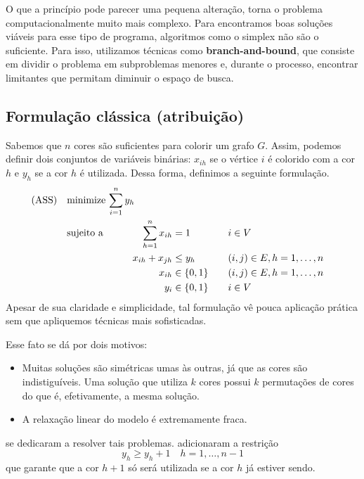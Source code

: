 \documentclass[11pt]{article}
\begin{document}
O que a princípio pode parecer uma pequena alteração, torna o problema computacionalmente muito mais complexo.
Para encontramos boas soluções viáveis para esse tipo de programa, algoritmos como o simplex não são o suficiente.
Para isso, utilizamos técnicas como \textbf{branch-and-bound}, que consiste em dividir o problema em subproblemas menores e, durante o processo, encontrar limitantes que permitam diminuir o espaço de busca.

\subsection{Formulação clássica (atribuição)}
\label{sec:org83e1630}
Sabemos que \(n\) cores são suficientes para colorir um grafo \(G\). Assim, podemos definir dois conjuntos de variáveis binárias: \(x_{ih}\) se o vértice \(i\) é colorido com a cor \(h\) e \(y_h\) se a cor \(h\) é utilizada. Dessa forma, definimos a seguinte formulação.
\begin{alignat*}{4}
\mathrm{(ASS)} \quad & \omit\rlap{minimize  $\displaystyle \sum_{i=1}^n y_h$} \\
& \mbox{sujeito a}&& \quad & \sum_{h=1}^n x_{ih}&= 1        & \quad & i \in V \\
&                 &&   & x_{ih} + x_{jh}    & \leq y_h &   & (i,j) \in E, h=1,\dots,n \\
&                 &&   & x_{ih}    & \in \{0,1\} &   & (i,j) \in E, h=1,\dots,n\\
&                 &&   & y_i       & \in \{0,1\} &   & i \in V
\end{alignat*}
Apesar de sua claridade e simplicidade, tal formulação vê pouca aplicação prática sem que apliquemos técnicas mais sofisticadas.

Esse fato se dá por dois motivos:
\begin{itemize}
\item Muitas soluções são simétricas umas às outras, já que as cores são indistiguíveis. Uma solução que utiliza \(k\) cores possui \(k\) permutações de cores do que é, efetivamente, a mesma solução.
\item A relaxação linear do modelo é extremamente fraca.
\end{itemize}

\textcites{MendezDiaz2006BranchCutAlgorithm}[][]{MendezDiaz2008CuttingPlaneAlgorithm} se dedicaram a resolver tais problemas.
\textcite{MendezDiaz2006BranchCutAlgorithm} adicionaram a restrição
\[ y_h \geq y_h+1 \quad h = 1, \dots, n-1 \]
que garante que a cor \(h+1\) só será utilizada se a cor \(h\) já estiver sendo.
\end{document}
